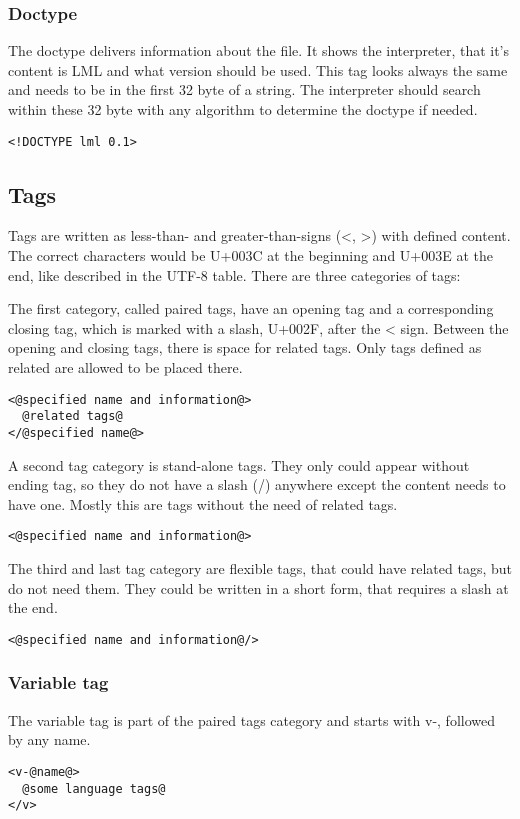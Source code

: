\documentclass[12pt,a4paper]{article}
\begin{document}
\subsubsection*{Doctype}
The doctype delivers information about the file. It shows the interpreter, that it's content is LML and what version should be used. This tag looks always the same and needs to be in the first 32 byte of a string. The interpreter should search within these 32 byte with any algorithm to determine the doctype if needed.
\begin{lstlisting}[frame=single,style=base]
<!DOCTYPE lml 0.1>
\end{lstlisting}

\subsection{Tags}

Tags are written as less-than- and greater-than-signs (<, >) with defined content. The correct characters would be  U+003C at the beginning and U+003E at the end, like described in the UTF-8 table. There are three categories of tags:

The first category, called paired tags, have an opening tag and a corresponding closing tag, which is marked with a slash, U+002F, after the < sign. Between the opening and closing tags, there is space for related tags. Only tags defined as related are allowed to be placed there.
\begin{lstlisting}[frame=single,style=base]
<@specified name and information@>
  @related tags@
</@specified name@>
\end{lstlisting}

A second tag category is stand-alone tags. They only could appear without ending tag, so they do not have a slash (/) anywhere except the content needs to have one. Mostly this are tags without the need of related tags.
\begin{lstlisting}[frame=single,style=base]
<@specified name and information@>
\end{lstlisting}

The third and last tag category are flexible tags, that could have related tags, but do not need them. They could be written in a short form, that requires a slash at the end.
\begin{lstlisting}[frame=single,style=base]
<@specified name and information@/>
\end{lstlisting}

\subsubsection*{Variable tag}
The variable tag is part of the paired tags category and starts with v-, followed by any name.
\begin{lstlisting}[frame=single,style=base]
<v-@name@>
  @some language tags@
</v>
\end{lstlisting}
\end{document}
